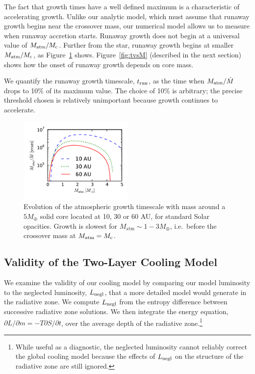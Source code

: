 \documentclass[apj, numberedappendix]{emulateapj}
\newcommand{\p}{\partial}
\newcommand{\Fig}[1]{Figure~\ref{#1}}
\newcommand{\Figs}[2]{Figs.~\ref{#1} and \ref{#2}}
\newcommand{\co}{_{\rm c}}
\begin{document}
The fact that growth times have a well defined maximum is a characteristic of accelerating growth.  Unlike our analytic model, which must assume that runaway growth begins near the crossover mass, our numerical model allows us to measure when runaway accretion starts.  Runaway growth does not begin at a universal value of $M_{\rm atm}/M\co$.  Further from the star, runaway growth begins at smaller $M_{\rm atm}/M\co$, as \Fig{fig:growthtime} shows.  \Fig{fig:tvsM} (described in the next section) shows how the onset of runaway growth depends on core mass. 

We quantify the runaway growth timescale, $t_{\rm run}$, as the time when $M_{\rm atm}/\dot{M}$ drops to 10\% of its maximum value.  The choice of 10\% is arbitrary; the precise threshold chosen is relatively unimportant because growth continues to accelerate.


\begin{figure}[tb]
\centering
\includegraphics[width=0.5\textwidth]{Mt_profile_temp.pdf}
\caption{Evolution of the atmospheric growth timescale with mass around a $5 M_{\oplus}$ solid core  located at 10, 30 or 60 AU, for standard Solar opacities.  Growth is slowest for $M_{\mathrm{atm}} \sim 1 - 3 M_{\oplus}$, i.e.\ before the crossover mass at $M_{\rm atm} = M\co$.}
\label{fig:growthtime}
\end{figure}

\subsection{Validity of the Two-Layer Cooling Model}
\label{sec:endoftime}

We examine the  validity of our cooling model by comparing our model luminosity to the neglected luminosity, $L_{\rm negl}$,  that a more detailed model would generate in the radiative zone.  We compute $L_{\rm negl}$ from the entropy difference between successive radiative zone solutions.  We then integrate the energy equation, $\p L / \p m = - T \p S/ \p t$, over the average depth of the radiative zone.\footnote{While useful as a diagnostic, the neglected luminosity cannot reliably correct the global cooling model because the effects of $L_{\rm negl}$ on the structure of the radiative zone are still ignored.}
\end{document}
